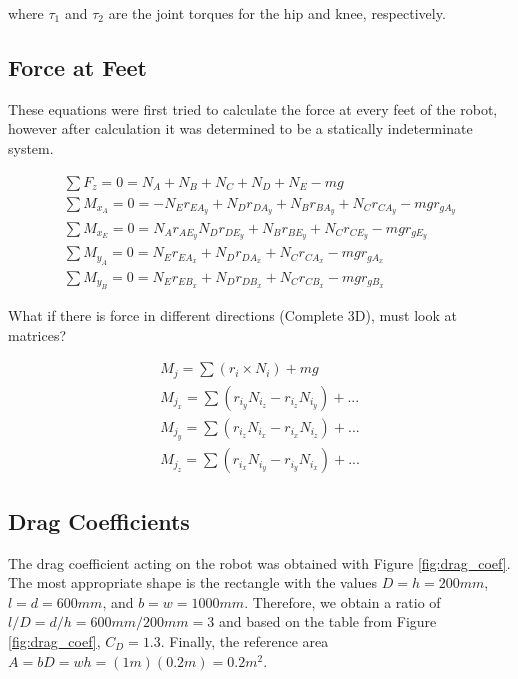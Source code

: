 where $\tau_1$ and $\tau_2$ are the joint torques for the hip and knee, respectively.


\subsection{Force at Feet}
\label{app:feet_force}
These equations were first tried to calculate the force at every feet of the robot, however after calculation it was determined to be a statically indeterminate system. 

\begin{gather}
    \sum F_z = 0 = N_A + N_B +N_C + N_D +N_E -mg
    \\
    \sum M_{x_A} = 0 = -N_E r_{EA_y} + N_D r_{DA_y} + N_B r_{BA_y} + N_C r_{CA_y} - mg r_{gA_y}
    \\
    \sum M_{x_E} = 0 = N_A r_{AE_y} N_D r_{DE_y} + N_B r_{BE_y} + N_C r_{CE_y} - mg r_{gE_y}
    \\
    \sum M_{y_A} = 0 = N_E r_{EA_x} + N_D r_{DA_x} + N_C r_{CA_x} -mg r_{gA_x}
    \\
    \sum M_{y_B} = 0 = N_E r_{EB_x} + N_D r_{DB_x} + N_C r_{CB_x} -mg r_{gB_x}
\end{gather}

What if there is force in different directions (Complete 3D), must look at matrices?

\begin{gather}
    M_j = \sum (r_i \times N_i) + mg
    \\
    M_{j_x} = \sum(r_{i_y} N_{i_z} - r_{i_z} N_{i_y}) + ...
    \\
    M_{j_y} = \sum(r_{i_z} N_{i_x} - r_{i_x} N_{i_z}) +...
    \\
    M_{j_z} = \sum(r_{i_x} N_{i_y} - r_{i_y} N_{i_x}) + ...
\end{gather}

\subsection{Drag Coefficients} \label{app:drag_coeff}

The drag coefficient acting on the robot was obtained with Figure \ref{fig:drag_coef}. The most appropriate shape is the rectangle with the values $D = h = 200 mm$, $l = d = 600 mm$, and $ b = w = 1000 mm$. Therefore, we obtain a ratio of $l/D = d/h = 600 mm / 200 mm = 3$ and based on the table from Figure \ref{fig:drag_coef}, $C_{D} = 1.3$. Finally, the reference area $A = bD = wh = (1 m)(0.2 m) = 0.2 m^2$.

